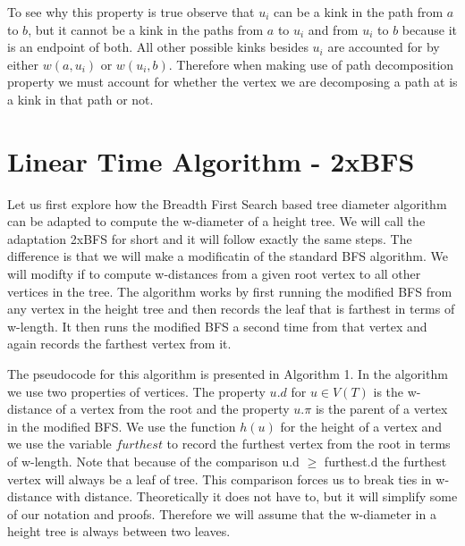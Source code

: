To see why this property is true observe that $u_i$ can be a kink in the path from $a$ to $b$, but it cannot be a kink in the paths from $a$ to $u_i$ and from $u_i$ to $b$ because it is an endpoint of both. All other possible kinks besides $u_i$ are accounted for by either $w(a, u_i)$ or $w(u_i, b)$. Therefore when making use of path decomposition property we must account for whether the vertex we are decomposing a path at is a kink in that path or not.


\section{Linear Time Algorithm - 2xBFS}

Let us first explore how the Breadth First Search based tree diameter algorithm can be adapted to compute the w-diameter of a height tree. We will call the adaptation 2xBFS for short and it will follow exactly the same steps. The difference is that we will make a modificatin of the standard BFS algorithm. We will modifty if to compute w-distances from a given root vertex to all other vertices in the tree. The algorithm works by first running the modified BFS from any vertex in the height tree and then records the leaf that is farthest in terms of w-length. It then runs the modified BFS a second time from that vertex and again records the farthest vertex from it.

The pseudocode for this algorithm is presented in Algorithm 1. In the algorithm we use two properties of vertices. The property $u.d$ for $u \in V(T)$ is the w-distance of a vertex from the root and the property $u.\pi$ is the parent of a vertex in the modified BFS. We use the function $h(u)$ for the height of a vertex and we use the variable $furthest$ to record the furthest vertex from the root in terms of w-length. Note that because of the comparison u.d $\ge$ furthest.d the furthest vertex will always be a leaf of tree. This comparison forces us to break ties in w-distance with distance. Theoretically it does not have to, but it will simplify some of our notation and proofs. Therefore we will assume that the w-diameter in a height tree is always between two leaves.

